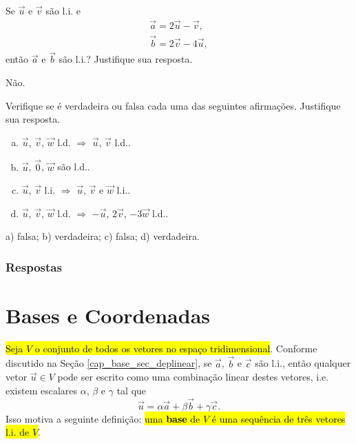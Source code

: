 \begin{exer}
  Se $\vec{u}$ e $\vec{v}$ são l.i. e
  \begin{align}
    \vec{a} = 2\vec{u} - \vec{v},\\
    \vec{b} = 2\vec{v} - 4\vec{u},
  \end{align}
  então $\vec{a}$ e $\vec{b}$ são l.i.? Justifique sua resposta.
\end{exer}
\begin{resp}
  Não.
\end{resp}

\begin{exer}
  Verifique se é verdadeira ou falsa cada uma das seguintes afirmações. Justifique sua resposta.
  \begin{enumerate}[a)]
  \item $\vec{u}$, $\vec{v}$, $\vec{w}$ l.d. $\Rightarrow$ $\vec{u}$, $\vec{v}$ l.d..
  \item $\vec{u}$, $\vec{0}$, $\vec{w}$ são l.d..
  \item $\vec{u}$, $\vec{v}$ l.i. $\Rightarrow$ $\vec{u}$, $\vec{v}$ e $\vec{w}$ l.i..
  \item $\vec{u}$, $\vec{v}$, $\vec{w}$ l.d. $\Rightarrow$ $-\vec{u}$, $2\vec{v}$, $-3\vec{w}$ l.d..
  \end{enumerate}
\end{exer}
\begin{resp}
  a) falsa; b) verdadeira; c) falsa; d) verdadeira.
\end{resp}

\ifisbook
\subsubsection{Respostas}
\shipoutAnswer
\fi

\section{Bases e Coordenadas}\label{cap_base_sec_base}

\hl{Seja $V$ o conjunto de todos os vetores no espaço tridimensional}. Conforme discutido na Seção \ref{cap_base_sec_deplinear}, se $\vec{a}$, $\vec{b}$ e $\vec{c}$ são l.i., então qualquer vetor $\vec{u}\in V$ pode ser escrito como uma combinação linear destes vetores, i.e. existem escalares $\alpha$, $\beta$ e $\gamma$ tal que
\begin{equation}
  \vec{u} = \alpha\vec{a} + \beta\vec{b} + \gamma\vec{c}.
\end{equation}
Isso motiva a seguinte definição: \hl{uma \textbf{base} de $V$ é uma sequência de três vetores l.i. de $V$}.

